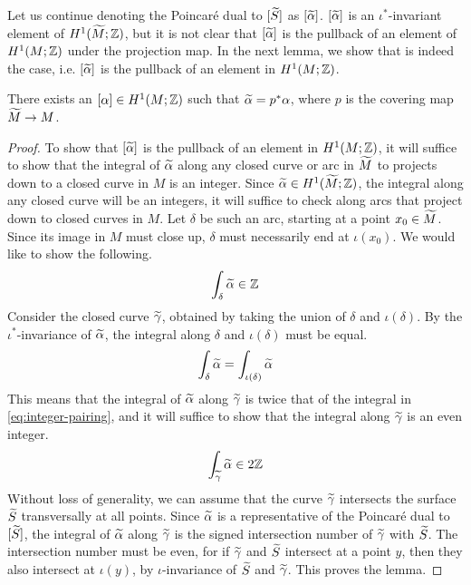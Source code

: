 Let us continue denoting the Poincar\'e dual to $[\widetilde{S}]$ as $[\widetilde{\alpha}]$.
$[\widetilde{\alpha}]$ is an $\iota^{\ast}$-invariant element of $H^1(\widetilde{M}; \mathbb{Z})$, but it is not clear that $[\widetilde{\alpha}]$ is the pullback of an element of $H^1(M; \mathbb{Z})$ under the projection map.
In the next lemma, we show that is indeed the case, i.e. $[\widetilde{\alpha}]$ is the pullback of an element in $H^1(M; \mathbb{Z})$.
\begin{lem}
  \label{lem:PD2}
  There exists an $[\alpha] \in H^1(M; \mathbb{Z})$ such that $\widetilde{\alpha} = p^{\ast} \alpha$, where $p$ is the covering map $\widetilde{M} \to M$.
\end{lem}
\begin{proof}
  To show that $[\widetilde{\alpha}]$ is the pullback of an element in $H^1(M; \mathbb{Z})$, it will suffice to show that the integral of $\widetilde{\alpha}$ along any closed curve or arc in $\widetilde{M}$ to projects down to a closed curve in $M$ is an integer.
  Since $\widetilde{\alpha} \in H^1(\widetilde{M}; \mathbb{Z})$, the integral along any closed curve will be an integers, it will suffice to check along arcs that project down to closed curves in $M$.
  Let $\delta$ be such an arc, starting at a point $x_0 \in \widetilde{M}$.
  Since its image in $M$ must close up, $\delta$ must necessarily end at $\iota(x_0)$.
  We would like to show the following.
  \begin{align}
    \label{eq:integer-pairing}
    \int_{\delta} \widetilde{\alpha} \in \mathbb{Z}
  \end{align}
  Consider the closed curve $\widetilde{\gamma}$, obtained by taking the union of $\delta$ and $\iota(\delta)$.
  By the $\iota^{\ast}$-invariance of $\widetilde{\alpha}$, the integral along $\delta$ and $\iota(\delta)$ must be equal.
  \begin{align*}
    \int_{\delta} \widetilde{\alpha} = \int_{\iota(\delta)} \widetilde{\alpha}
  \end{align*}
  This means that the integral of $\widetilde{\alpha}$ along $\widetilde{\gamma}$ is twice that of the integral in \eqref{eq:integer-pairing}, and it will suffice to show that the integral along $\widetilde{\gamma}$ is an even integer.
  \begin{align*}
    \int_{\widetilde{\gamma}} \widetilde{\alpha} \in 2\mathbb{Z}
  \end{align*}
  Without loss of generality, we can assume that the curve $\widetilde{\gamma}$ intersects the surface $\widetilde{S}$ transversally at all points.
  Since $\widetilde{\alpha}$ is a representative of the Poincar\'e dual to $[\widetilde{S}]$, the integral of $\widetilde{\alpha}$ along $\widetilde{\gamma}$ is the signed intersection number of $\widetilde{\gamma}$ with $\widetilde{S}$.
  The intersection number must be even, for if $\widetilde{\gamma}$ and $\widetilde{S}$ intersect at a point $y$, then they also intersect at $\iota(y)$, by $\iota$-invariance of $\widetilde{S}$ and $\widetilde{\gamma}$. This proves the lemma.
\end{proof}
